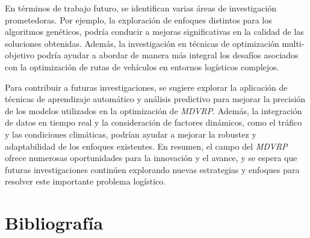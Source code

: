 \documentclass[letter, 10pt]{article}
\begin{document}
En términos de trabajo futuro, se identifican varias áreas de investigación prometedoras. Por ejemplo, la exploración de enfoques distintos para los algoritmos genéticos, podría conducir a mejoras significativas en la calidad de las soluciones obtenidas. Además, la investigación en técnicas de optimización multi-objetivo podría ayudar a abordar de manera más integral los desafíos asociados con la optimización de rutas de vehículos en entornos logísticos complejos.

Para contribuir a futuras investigaciones, se sugiere explorar la aplicación de técnicas de aprendizaje automático y análisis predictivo para mejorar la precisión de los modelos utilizados en la optimización de \textit{MDVRP}. Además, la integración de datos en tiempo real y la consideración de factores dinámicos, como el tráfico y las condiciones climáticas, podrían ayudar a mejorar la robustez y adaptabilidad de los enfoques existentes. En resumen, el campo del \textit{MDVRP} ofrece numerosas oportunidades para la innovación y el avance, y se espera que futuras investigaciones continúen explorando nuevas estrategias y enfoques para resolver este importante problema logístico.

\section{Bibliografía}


\end{document}
